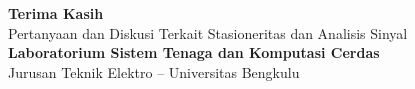 \documentclass[aspectratio=169, 10pt]{beamer}
\begin{document}
\begin{frame}[plain]
    \begin{center}
        \vspace{1.5cm}
        {\Huge \color{mainblue} \textbf{Terima Kasih}}\\[0.4cm]
        {\large Pertanyaan dan Diskusi Terkait Stasioneritas dan Analisis Sinyal}\\[1.2cm]
        \textbf{Laboratorium Sistem Tenaga dan Komputasi Cerdas}\\
        Jurusan Teknik Elektro -- Universitas Bengkulu
    \end{center}
\end{frame}
\end{document}
